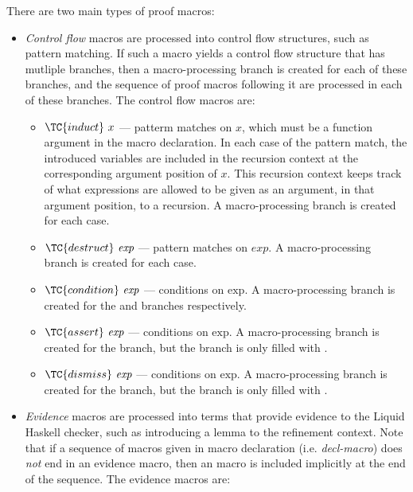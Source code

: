 There are two main types of proof macros: 
\begin{itemize}
  \item
  \textit{Control flow} macros are processed into control flow structures, such as pattern matching. 
  If such a macro yields a control flow structure that has mutliple branches, then a macro-processing branch is created for each of these branches, and the sequence of proof macros following it are processed in each of these branches.
  The control flow macros are:
  \begin{itemize}
    \item
    $\TC{induct} ~ x$ --- patterm matches on $x$, which must be a function argument in the macro declaration.
    In each case of the pattern match, the introduced variables are included in the recursion context at the corresponding argument position of $x$.
    This recursion context keeps track of what expressions are allowed to be given as an argument, in that argument position, to a recursion.
    A macro-processing branch is created for each case.
    \item $\TC{destruct} ~ \textit{exp}$ --- pattern matches on $\textit{exp}$. A macro-processing branch is created for each case.
    \item $\TC{condition} ~ \textit{exp}$ --- conditions on $\text{exp}$. A macro-processing branch is created for the  and  branches respectively.
    \item $\TC{assert} ~ \textit{exp}$ --- conditions on $\text{exp}$. A macro-processing branch is created for the  branch, but the  branch is only filled with .
    \item $\TC{dismiss} ~ \textit{exp}$ --- conditions on $\text{exp}$. A macro-processing branch is created for the  branch, but the  branch is only filled with .
  \end{itemize}
  \item
  \textit{Evidence} macros are processed into terms that provide evidence to the Liquid Haskell checker, such as introducing a lemma to the refinement context.
  Note that if a sequence of macros given in macro declaration (i.e. \textit{decl-macro}) does \textit{not} end in an evidence macro, then an  macro is included implicitly at the end of the sequence.
  The evidence macros are:
  \begin{itemize}

\end{itemize}
\end{itemize}
